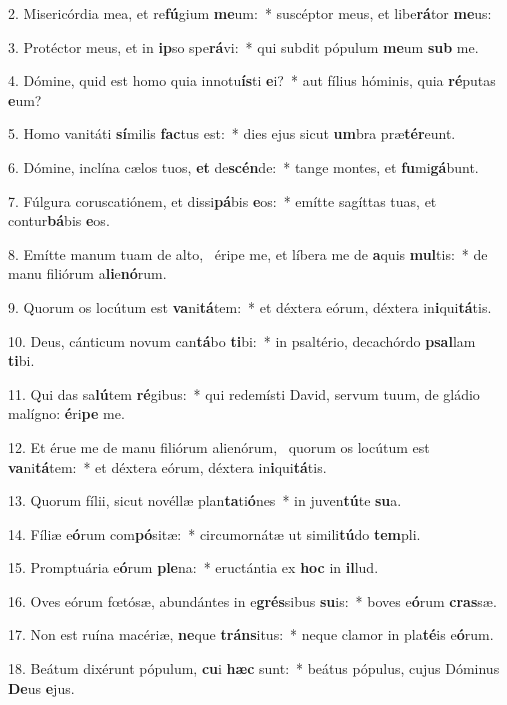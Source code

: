 2. Misericórdia mea, et re\textbf{fú}gium \textbf{me}um:~*  suscéptor meus, et libe\textbf{rá}tor \textbf{me}us:\

3. Protéctor meus, et in \textbf{ip}so spe\textbf{rá}vi:~*  qui subdit pópulum \textbf{me}um \textbf{sub} me.\

4. Dómine, quid est homo quia innotu\textbf{ís}ti \textbf{e}i?~*  aut fílius hóminis, quia \textbf{ré}putas \textbf{e}um?\

5. Homo vanitáti \textbf{sí}milis \textbf{fac}tus est:~*  dies ejus sicut \textbf{um}bra præ\textbf{tér}eunt.\

6. Dómine, inclína cælos tuos, \textbf{et} de\textbf{scén}de:~*  tange montes, et \textbf{fu}mi\textbf{gá}bunt.\

7. Fúlgura coruscatiónem, et dissi\textbf{pá}bis \textbf{e}os:~*  emítte sagíttas tuas, et contur\textbf{bá}bis \textbf{e}os.\

8. Emítte manum tuam de alto, \dag\  éripe me, et líbera me de \textbf{a}quis \textbf{mul}tis:~*  de manu filiórum a\textbf{li}e\textbf{nó}rum.\

9. Quorum os locútum est \textbf{va}ni\textbf{tá}tem:~*  et déxtera eórum, déxtera in\textbf{i}qui\textbf{tá}tis.\

10. Deus, cánticum novum can\textbf{tá}bo \textbf{ti}bi:~*  in psaltério, decachórdo \textbf{psal}lam \textbf{ti}bi.\

11. Qui das sa\textbf{lú}tem \textbf{ré}gibus:~*  qui redemísti David, servum tuum, de gládio malígno: \textbf{é}ri\textbf{pe} me.\

12. Et érue me de manu filiórum alienórum, \dag\  quorum os locútum est \textbf{va}ni\textbf{tá}tem:~*  et déxtera eórum, déxtera in\textbf{i}qui\textbf{tá}tis.\

13. Quorum fílii, sicut novéllæ plan\textbf{ta}ti\textbf{ó}nes~*  in juven\textbf{tú}te \textbf{su}a.\

14. Fíliæ e\textbf{ó}rum com\textbf{pó}sitæ:~*  circumornátæ ut simili\textbf{tú}do \textbf{tem}pli.\

15. Promptuária e\textbf{ó}rum \textbf{ple}na:~*  eructántia ex \textbf{hoc} in \textbf{il}lud.\

16. Oves eórum fœtósæ, abundántes in e\textbf{grés}sibus \textbf{su}is:~*  boves e\textbf{ó}rum \textbf{cras}sæ.\

17. Non est ruína macériæ, \textbf{ne}que \textbf{tráns}itus:~*  neque clamor in pla\textbf{té}is e\textbf{ó}rum.\

18. Beátum dixérunt pópulum, \textbf{cu}i \textbf{hæc} sunt:~*  beátus pópulus, cujus Dóminus \textbf{De}us \textbf{e}jus.\

